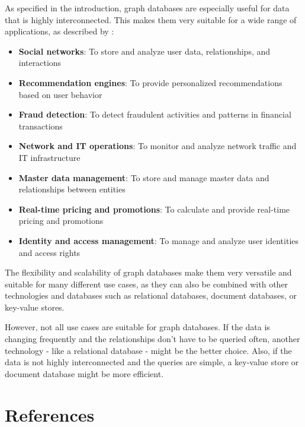 \documentclass[english,smartquotes,apa]{hgbreport}
\begin{document}
As specified in the introduction, graph databases are especially useful for data that is highly interconnected. This makes them very suitable for a wide range of applications, as described by \cite{neo4j}:

\begin{itemize}
	\item \textbf{Social networks}: To store and analyze user data, relationships, and interactions
	\item \textbf{Recommendation engines}: To provide personalized recommendations based on user behavior
	\item \textbf{Fraud detection}: To detect fraudulent activities and patterns in financial transactions
	\item \textbf{Network and IT operations}: To monitor and analyze network traffic and IT infrastructure
	\item \textbf{Master data management}: To store and manage master data and relationships between entities
	\item \textbf{Real-time pricing and promotions}: To calculate and provide real-time pricing and promotions
	\item \textbf{Identity and access management}: To manage and analyze user identities and access rights
\end{itemize}

The flexibility and scalability of graph databases make them very versatile and suitable for many different use cases, as they can also be combined with other technologies and databases such as relational databases, document databases, or key-value stores.

However, not all use cases are suitable for graph databases. If the data is changing frequently and the relationships don't have to be queried often, another technology - like a relational database - might be the better choice. Also, if the data is not highly interconnected and the queries are simple, a key-value store or document database might be more efficient. 


  
\chapter*{References}
\printbibliography[heading=noheader]


\end{document}
